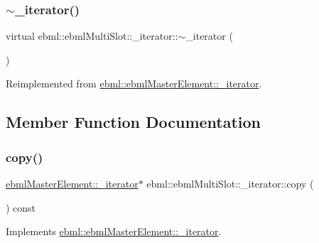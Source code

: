 \subsubsection{\texorpdfstring{$\sim$\+\_\+iterator()}{~\_iterator()}}
{\footnotesize\ttfamily virtual ebml\+::ebml\+Multi\+Slot\+::\+\_\+iterator\+::$\sim$\+\_\+iterator (\begin{DoxyParamCaption}{ }\end{DoxyParamCaption})\hspace{0.3cm}{\ttfamily [virtual]}}



Reimplemented from \mbox{\hyperlink{classebml_1_1ebmlMasterElement_1_1__iterator_a499f5fe9a5dddf51dd0ca181fc98f561}{ebml\+::ebml\+Master\+Element\+::\+\_\+iterator}}.



\subsection{Member Function Documentation}
\mbox{\label{classebml_1_1ebmlMultiSlot_1_1__iterator_a7f26180e096089e0a14986731bc04326}} 
\subsubsection{\texorpdfstring{copy()}{copy()}}
{\footnotesize\ttfamily \mbox{\hyperlink{classebml_1_1ebmlMasterElement_1_1__iterator}{ebml\+Master\+Element\+::\+\_\+iterator}}$\ast$ ebml\+::ebml\+Multi\+Slot\+::\+\_\+iterator\+::copy (\begin{DoxyParamCaption}{ }\end{DoxyParamCaption}) const\hspace{0.3cm}{\ttfamily [virtual]}}



Implements \mbox{\hyperlink{classebml_1_1ebmlMasterElement_1_1__iterator_af9f522b6d6f34acb410add9579a35c13}{ebml\+::ebml\+Master\+Element\+::\+\_\+iterator}}.

\mbox{\label{classebml_1_1ebmlMultiSlot_1_1__iterator_a250650c2080db120a29383e5f588feeb}} 
